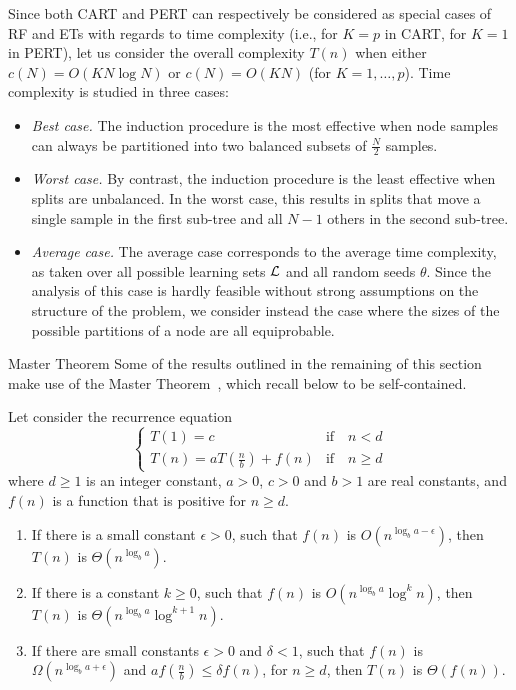 Since both CART and PERT can respectively be considered as special cases of RF
and ETs with regards to time complexity (i.e., for $K=p$ in CART, for $K=1$ in
PERT), let us consider the overall complexity $T(n)$ when either
$c(N)=O(KN\log N)$ or $c(N)=O(KN)$ (for $K=1,\dots,p$). Time complexity
is studied in three cases:

\begin{itemize}
\item \textit{Best case.} The induction procedure is the most effective
      when node samples can always be partitioned into two balanced subsets of $\tfrac{N}{2}$
      samples.

\item \textit{Worst case.} By contrast, the induction procedure is the least
      effective when splits are unbalanced. In the worst case,
      this results in splits that move a single sample in the first sub-tree and
      all $N-1$ others in the second sub-tree.

\item \textit{Average case.} The average case corresponds to the average time
      complexity, as taken over all possible learning sets ${\cal L}$ and
      all random seeds $\theta$.  Since the analysis of this case is hardly
      feasible without strong assumptions on the structure of the problem,
      we consider instead the case where the sizes of the possible
      partitions of a node are all equiprobable.

\end{itemize}

\begin{remark}{Master Theorem}
Some of the results outlined in the remaining of this section make use of the
Master Theorem~\citep{goodrich:2006}, which recall below to be self-contained.

\begin{theorem}
Let consider the recurrence equation
\begin{equation}
\begin{cases}
T(1) = c & \text{if}\quad n < d\\
T(n) = aT(\frac{n}{b}) + f(n) & \text{if}\quad n \geq d
\end{cases}
\end{equation}
where $d \geq 1$ is an integer constant, $a > 0$, $c>0$ and $b>1$ are real constants, and
$f(n)$ is a function that is positive for $n \geq d$.

\begin{enumerate}
\item If there is a small constant $\epsilon > 0$, such that $f(n)$ is $O(n^{\log_b a - \epsilon})$, then $T(n)$ is $\Theta(n^{\log_b a})$.
\item If there is a constant $k \geq 0$, such that $f(n)$ is $O(n^{\log_b a} \log^k n)$, then $T(n)$ is $\Theta(n^{\log_b a} \log^{k+1} n)$.
\item If there are small constants $\epsilon > 0$ and $\delta < 1$, such that $f(n)$ is $\Omega(n^{\log_b a + \epsilon})$ and $af(\tfrac{n}{b}) \leq \delta f(n)$, for $n \geq d$, then $T(n)$ is $\Theta(f(n))$.
\end{enumerate}
\end{theorem}
\end{remark}

